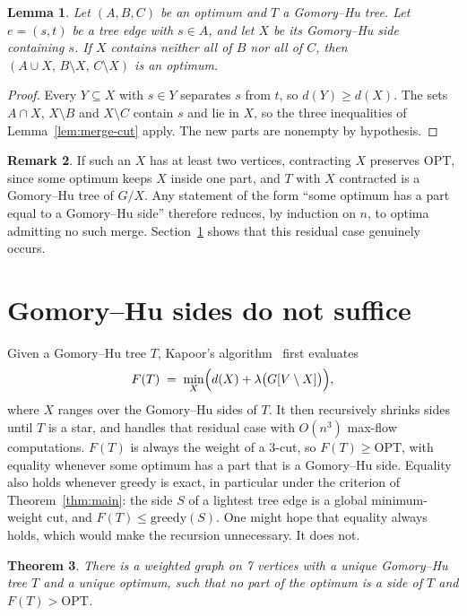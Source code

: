 \documentclass[preprint,12pt]{elsarticle}
\newtheorem{theorem}{Theorem}
\newtheorem{lemma}[theorem]{Lemma}
\theoremstyle{definition}
\newtheorem{remark}[theorem]{Remark}
\newcommand{\OPT}{\mathrm{OPT}}
\newcommand{\greedy}{\mathrm{greedy}}
\begin{document}
\begin{lemma}\label{lem:merge-gh}
Let $(A,B,C)$ be an optimum and $T$ a Gomory--Hu tree. Let $e=(s,t)$ be a tree edge with $s\in A$, and
let $X$ be its Gomory--Hu side containing $s$. If $X$ contains neither all of $B$ nor all of $C$, then
$(A\cup X,\,B\setminus X,\,C\setminus X)$ is an optimum.
\end{lemma}

\begin{proof}
Every $Y\subseteq X$ with $s\in Y$ separates $s$ from $t$, so $d(Y)\ge d(X)$. The sets $A\cap X$,
$X\setminus B$ and $X\setminus C$ contain $s$ and lie in $X$, so the three inequalities of
Lemma~\ref{lem:merge-cut} apply. The new parts are nonempty by hypothesis.
\end{proof}

\begin{remark}
If such an $X$ has at least two vertices, contracting $X$ preserves $\OPT$, since some optimum keeps
$X$ inside one part, and $T$ with $X$ contracted is a Gomory--Hu tree of $G/X$. Any statement of the
form ``some optimum has a part equal to a Gomory--Hu side'' therefore reduces, by induction on $n$, to
optima admitting no such merge. Section~\ref{sec:cex} shows that this residual case genuinely occurs.
\end{remark}

\section{Gomory--Hu sides do not suffice}\label{sec:cex}

Given a Gomory--Hu tree $T$, Kapoor's algorithm~\cite{Kapoor1996} first evaluates
\[
  F(T) \;=\; \min_{X}\Bigl(d(X)+\lambda\bigl(G[V\setminus X]\bigr)\Bigr),
\]
where $X$ ranges over the Gomory--Hu sides of $T$. It then recursively shrinks sides until $T$ is a
star, and handles that residual case with $O(n^3)$ max-flow computations. $F(T)$ is always the weight
of a 3-cut, so $F(T)\ge\OPT$, with equality whenever some optimum has a part that is a Gomory--Hu side.
Equality also holds whenever greedy is exact, in particular under the criterion of
Theorem~\ref{thm:main}: the side $S$ of a lightest tree edge is a global minimum-weight cut, and
$F(T)\le\greedy(S)$. One might hope that equality always holds, which would make
the recursion unnecessary. It does not.

\begin{theorem}\label{thm:cex}
There is a weighted graph on 7 vertices with a unique Gomory--Hu tree $T$ and a unique optimum, such
that no part of the optimum is a side of $T$ and $F(T)>\OPT$.
\end{theorem}
\end{document}
